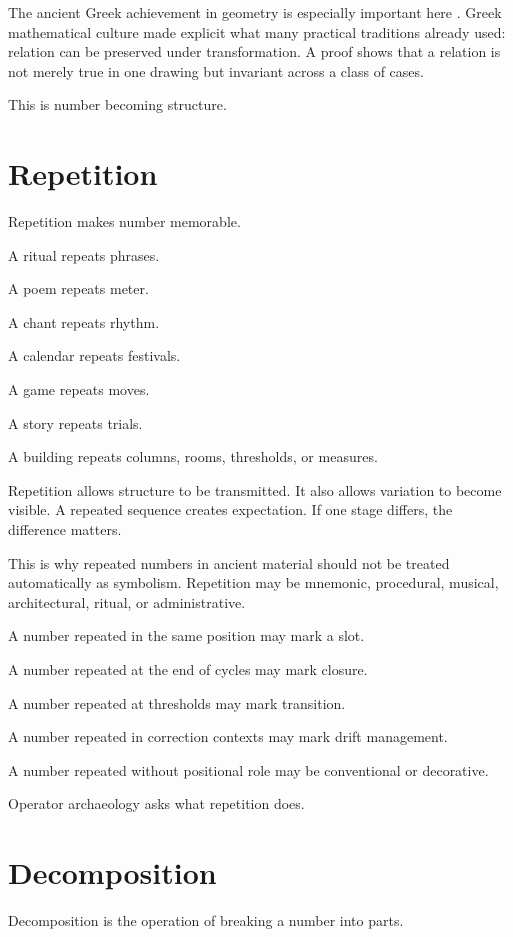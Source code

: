 \documentclass[11pt]{book}
\begin{document}
The ancient Greek achievement in geometry is especially important here \cite{Heath1921GreekMathematics,Netz1999ShapingDeduction}. Greek mathematical culture made explicit what many practical traditions already used: relation can be preserved under transformation. A proof shows that a relation is not merely true in one drawing but invariant across a class of cases.

This is number becoming structure.

\section{Repetition}

Repetition makes number memorable.

A ritual repeats phrases.

A poem repeats meter.

A chant repeats rhythm.

A calendar repeats festivals.

A game repeats moves.

A story repeats trials.

A building repeats columns, rooms, thresholds, or measures.

Repetition allows structure to be transmitted. It also allows variation to become visible. A repeated sequence creates expectation. If one stage differs, the difference matters.

This is why repeated numbers in ancient material should not be treated automatically as symbolism. Repetition may be mnemonic, procedural, musical, architectural, ritual, or administrative.

A number repeated in the same position may mark a slot.

A number repeated at the end of cycles may mark closure.

A number repeated at thresholds may mark transition.

A number repeated in correction contexts may mark drift management.

A number repeated without positional role may be conventional or decorative.

Operator archaeology asks what repetition does.

\section{Decomposition}

Decomposition is the operation of breaking a number into parts.
\end{document}
